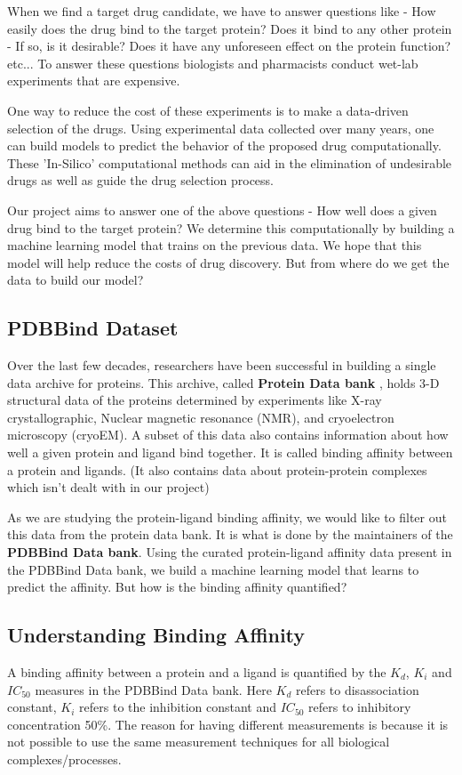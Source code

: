 \documentclass[11pt]{article}
\begin{document}
When we find a target drug candidate, we have to answer questions like - How easily does the drug bind to the target protein? Does it bind to any other protein - If so, is it desirable? Does it have any unforeseen effect on the protein function? etc...  To answer these questions biologists and pharmacists conduct wet-lab experiments that are expensive.

One way to reduce the cost of these experiments is to make a data-driven selection of the drugs.  Using experimental data collected over many years, one can build models to predict the behavior of the proposed drug computationally.  These 'In-Silico' computational methods can aid in the elimination of undesirable drugs as well as guide the drug selection process.

Our project aims to answer one of the above questions - How well does a given drug bind to the target protein? We determine this computationally by building a machine learning model that trains on the previous data.  We hope that this model will help reduce the costs of drug discovery.  But from where do we get the data to build our model?

\subsection{PDBBind Dataset}
Over the last few decades, researchers have been successful in building a single data archive for proteins.
This archive, called \textbf{Protein Data bank} \cite{pdb_homepage} , holds 3-D structural data of the proteins determined by experiments
like X-ray crystallographic, Nuclear magnetic resonance (NMR), and cryoelectron microscopy (cryoEM).
A subset of this data also contains information about how well a given protein and ligand bind together.
It is called binding affinity between a protein and ligands.
(It also contains data about protein-protein complexes which isn't dealt with in our project)
\cite{pdbank_history}

As we are studying the protein-ligand binding affinity, we would like to filter out this data from the protein data bank.
It is what is done by the maintainers of the \textbf{PDBBind Data bank}.
\cite{pdbbind_introduction}
Using the curated protein-ligand affinity data present in the PDBBind Data bank, we build a machine learning model that learns to predict the affinity.
But how is the binding affinity quantified?

\subsection{Understanding Binding Affinity}
A binding affinity between a protein and a ligand is quantified by the $K_d$, $K_i$ and $IC_{50}$ measures in the PDBBind Data bank.
Here $K_d$ refers to disassociation constant, $K_i$ refers to the inhibition constant and $IC_{50}$ refers to 
inhibitory concentration 50\%.
The reason for having different measurements is because it is not possible to use the same measurement techniques
for all biological complexes/processes.
\end{document}
